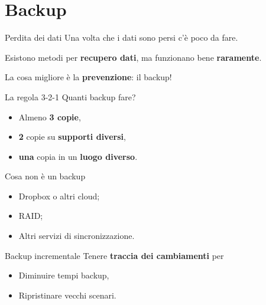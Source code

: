 
\section{Backup}

\begin{myframe}{Perdita dei dati}
  Una volta che i dati sono persi c'è poco da fare.

  Esistono metodi per \textbf{recupero dati}, ma funzionano bene \textbf{raramente}.

  La cosa migliore è la \textbf{prevenzione}: il backup!
\end{myframe}

\begin{myframe}{La regola 3-2-1}
  Quanti backup fare?
  \pause
  \begin{itemize}[<+->]
    \item Almeno \textbf{3 copie},
    \item \textbf{2} copie su \textbf{supporti diversi},
    \item \textbf{una} copia in un \textbf{luogo diverso}.
  \end{itemize}

  \medskip
\end{myframe}

\begin{myframe}{Cosa non è un backup}
  \begin{itemize}[<+->]
    \item Dropbox o altri cloud;
    \item RAID;
    \item Altri servizi di sincronizzazione.
  \end{itemize}
  \medskip
\end{myframe}

\begin{myframe}{Backup incrementale}
  Tenere \textbf{traccia dei cambiamenti} per
  \begin{itemize}
    \item Diminuire tempi backup,
    \item Ripristinare vecchi scenari.
  \end{itemize}
\end{myframe}

